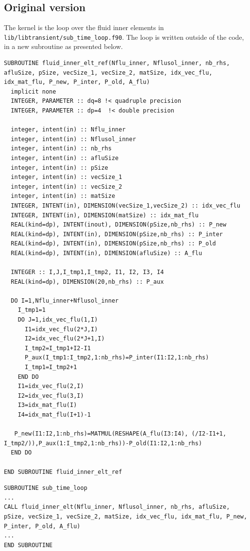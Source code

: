 \documentclass[10pt,twoside]{article}   	%
\begin{document}
\subsection{Original version}

The kernel is the loop over the fluid inner elements in \texttt{lib/libtransient/sub\_time\_loop.f90}. The loop is written outside of the code, in a new subroutine as presented below.

\lstset{language=FORTRAN}
\begin{lstlisting}[caption=kernel.f90]
SUBROUTINE fluid_inner_elt_ref(Nflu_inner, Nflusol_inner, nb_rhs, afluSize, pSize, vecSize_1, vecSize_2, matSize, idx_vec_flu, idx_mat_flu, P_new, P_inter, P_old, A_flu)
  implicit none
  INTEGER, PARAMETER :: dq=8 !< quadruple precision
  INTEGER, PARAMETER :: dp=4  !< double precision

  integer, intent(in) :: Nflu_inner
  integer, intent(in) :: Nflusol_inner
  integer, intent(in) :: nb_rhs
  integer, intent(in) :: afluSize
  integer, intent(in) :: pSize
  integer, intent(in) :: vecSize_1
  integer, intent(in) :: vecSize_2
  integer, intent(in) :: matSize
  INTEGER, INTENT(in), DIMENSION(vecSize_1,vecSize_2) :: idx_vec_flu
  INTEGER, INTENT(in), DIMENSION(matSize) :: idx_mat_flu
  REAL(kind=dp), INTENT(inout), DIMENSION(pSize,nb_rhs) :: P_new
  REAL(kind=dp), INTENT(in), DIMENSION(pSize,nb_rhs) :: P_inter
  REAL(kind=dp), INTENT(in), DIMENSION(pSize,nb_rhs) :: P_old
  REAL(kind=dp), INTENT(in), DIMENSION(afluSize) :: A_flu

  INTEGER :: I,J,I_tmp1,I_tmp2, I1, I2, I3, I4
  REAL(kind=dp), DIMENSION(20,nb_rhs) :: P_aux

  DO I=1,Nflu_inner+Nflusol_inner
    I_tmp1=1
    DO J=1,idx_vec_flu(1,I)
      I1=idx_vec_flu(2*J,I)
      I2=idx_vec_flu(2*J+1,I)
      I_tmp2=I_tmp1+I2-I1
      P_aux(I_tmp1:I_tmp2,1:nb_rhs)=P_inter(I1:I2,1:nb_rhs)
      I_tmp1=I_tmp2+1
    END DO
    I1=idx_vec_flu(2,I)
    I2=idx_vec_flu(3,I)
    I3=idx_mat_flu(I)
    I4=idx_mat_flu(I+1)-1

   P_new(I1:I2,1:nb_rhs)=MATMUL(RESHAPE(A_flu(I3:I4), (/I2-I1+1, I_tmp2/)),P_aux(1:I_tmp2,1:nb_rhs))-P_old(I1:I2,1:nb_rhs)
  END DO

END SUBROUTINE fluid_inner_elt_ref
\end{lstlisting}


\begin{lstlisting}[caption=sub\_time\_loop.f90]
SUBROUTINE sub_time_loop
...
CALL fluid_inner_elt(Nflu_inner, Nflusol_inner, nb_rhs, afluSize, pSize, vecSize_1, vecSize_2, matSize, idx_vec_flu, idx_mat_flu, P_new, P_inter, P_old, A_flu)
...
END SUBROUTINE 
\end{lstlisting}
\end{document}
